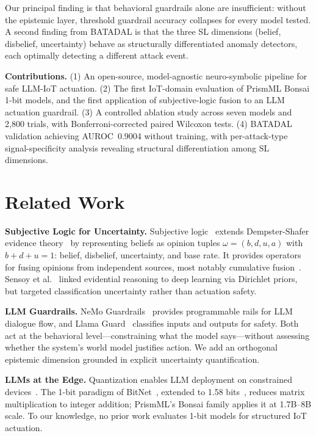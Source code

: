 \documentclass[conference]{IEEEtran}
\begin{document}
Our principal finding is that behavioral guardrails alone are insufficient: without the epistemic layer, threshold guardrail accuracy collapses for every model tested. A second finding from BATADAL is that the three SL dimensions (belief, disbelief, uncertainty) behave as structurally differentiated anomaly detectors, each optimally detecting a different attack event.

\textbf{Contributions.}
(1) An open-source, model-agnostic neuro-symbolic pipeline for safe LLM-IoT actuation.
(2) The first IoT-domain evaluation of PrismML Bonsai 1-bit models, and the first application of subjective-logic fusion to an LLM actuation guardrail.
(3) A controlled ablation study across seven models and 2{,}800 trials, with Bonferroni-corrected paired Wilcoxon tests.
(4) BATADAL validation achieving AUROC~0.9004 without training, with per-attack-type signal-specificity analysis revealing structural differentiation among SL dimensions.

\section{Related Work}

\textbf{Subjective Logic for Uncertainty.}
Subjective logic~\cite{josang2016subjective} extends Dempster-Shafer evidence theory~\cite{dempster1968generalization, shafer1976mathematical} by representing beliefs as opinion tuples $\omega = (b, d, u, a)$ with $b + d + u = 1$: belief, disbelief, uncertainty, and base rate. It provides operators for fusing opinions from independent sources, most notably cumulative fusion~\cite{josang2016subjective}. Sensoy et al.~\cite{sensoy2018evidential} linked evidential reasoning to deep learning via Dirichlet priors, but targeted classification uncertainty rather than actuation safety.

\textbf{LLM Guardrails.}
NeMo Guardrails~\cite{rebedea2023nemo} provides programmable rails for LLM dialogue flow, and Llama Guard~\cite{inan2023llama} classifies inputs and outputs for safety. Both act at the behavioral level---constraining what the model says---without assessing whether the system's world model justifies action. We add an orthogonal epistemic dimension grounded in explicit uncertainty quantification.

\textbf{LLMs at the Edge.}
Quantization enables LLM deployment on constrained devices~\cite{frantar2023gptq, lin2024awq}. The 1-bit paradigm of BitNet~\cite{wang2023bitnet}, extended to 1.58 bits~\cite{ma2024era}, reduces matrix multiplication to integer addition; PrismML's Bonsai family applies it at 1.7B--8B scale. To our knowledge, no prior work evaluates 1-bit models for structured IoT actuation.
\end{document}
